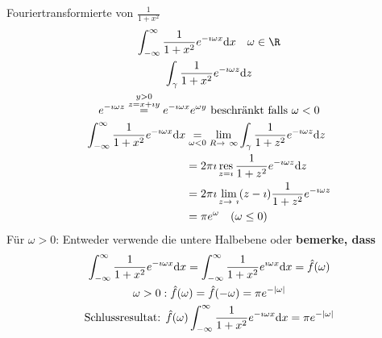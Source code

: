\begin{bsp*}
	Fouriertransformierte von $\frac{1}{1 + x^2}$
	\begin{gather*}
		\int_{-\infty}^{\infty} \frac{1}{1 + x^2} e^{-\imath\omega x} \dd x \quad \omega \in \R \\
		\int_{\gamma} \frac{1}{1 + x^2} e^{-\imath\omega z} \dd z \\
		e^{-\imath\omega z} \overset{\substack{y > 0 \\ z = x + \imath y}}{=} e^{-\imath\omega x} e^{\omega y} \text{ beschränkt falls } \omega < 0 \\
		\begin{split}
			\int_{-\infty}^{\infty} \frac{1}{1 + x^2} e^{-\imath\omega x} \dd x
				&\underset{\omega < 0}{=} \lim_{R \rightarrow \infty} \int_{\gamma} \frac{1}{1 + z^2} e^{-\imath\omega z} \dd z \\
				&= 2\pi\imath \res_{z=\imath} \frac{1}{1 + z^2} e^{-\imath\omega z} \dd z \\
				&= 2\pi\imath \lim_{z \rightarrow \imath} (z-\imath) \frac{1}{1 + z^2} e^{-\imath\omega z} \\
				&= \pi e^{\omega} \quad (\omega \leq 0)
		\end{split}
	\end{gather*}
	Für $\omega > 0$: Entweder verwende die untere Halbebene oder \textbf{bemerke, dass}
	\begin{gather*}
		\int_{-\infty}^{\infty} \frac{1}{1 + x^2} e^{-\imath\omega x} \dd x = \int_{-\infty}^{\infty} \frac{1}{1 + x^2} e^{\imath\omega x} \dd x = \hat{f}(\omega) \\
		\omega > 0 : \hat{f}(\omega) = \hat{f}(-\omega) = \pi e^{-\abs{\omega}} \\
		\text{Schlussresultat: } \hat{f}(\omega) \int_{-\infty}^{\infty} \frac{1}{1+x^2} e^{-\imath\omega x} \dd x = \pi e^{-\abs{\omega}}
	\end{gather*}
\end{bsp*}
